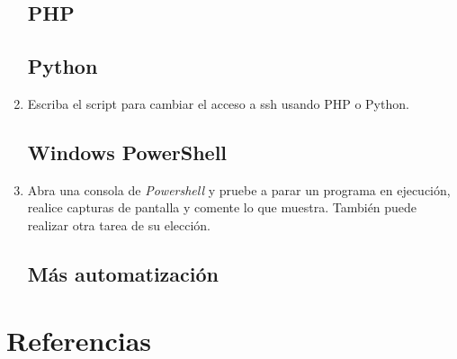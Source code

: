 \documentclass[paper=a4, fontsize=11pt]{scrartcl} %
\numberwithin{equation}{section} %
\numberwithin{figure}{section} %
\numberwithin{table}{section} %
\begin{document}
\begin{enumerate}
	\subsection{PHP}
	\subsection{Python}
	\item Escriba el script para cambiar el acceso a ssh usando PHP o Python.
	
	\subsection{Windows PowerShell}
	\item Abra una consola de \textit{Powershell} y pruebe a parar un programa en ejecución, realice
	capturas de pantalla y comente lo que muestra. También puede realizar otra tarea de su elección.
	
	\subsection{Más automatización}
	
\end{enumerate}

\newpage
\section{Referencias}

\end{document}
